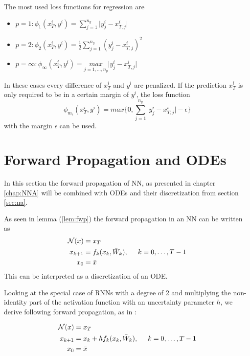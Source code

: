 \documentclass[a4paper, 12pt]{scrreprt} %
\begin{document}
The most used loss functions for regression are

\begin{itemize}
	\item $p=1: \phi_1(x^i_T,y^i)=\sum_{j=1}^{n_y}\vert y_j^i - x^i_{T,j} \vert$
	\item $p=2: \phi_2(x^i_T,y^i)=\frac{1}{2}\sum_{j=1}^{n_y}(y_j^i - x^i_{T,j})^2$
	\item $p=\infty: \phi_{\infty}(x^i_T,y^i)=\underset{j=1,\dots,n_y}{max}\vert y_j^i - x^i_{T,j} \vert$
\end{itemize}

In these cases every difference of $x^i_{T}$ and $y^i$ are penalized. If the prediction $x^i_{T}$ is only required to be in a certain margin of $y^i$, the loss function
\begin{equation*}
\phi_{m_{\epsilon}}(x^i_T,y^i) = max\{0,\sum_{j=1}^{n_y}\vert y_j^i - x^i_{T,j} \vert - \epsilon\}
\end{equation*}
with the margin $\epsilon$ can be used.


\section{Forward Propagation and \acp{ODE}}
\label{sec:fpaode}
In this section the forward propagation of \ac{NN}, as presented in chapter \ref{chap:NNA} will be combined with \acp{ODE} and their discretization from section \ref{sec:na}.  \cite{mpbafdl} \newline

As seen in lemma (\ref{lem:fwp}) the forward propagation in an \ac{NN} can be written as
\begin{align*}
\mathcal{N}(x) &= x_T \\
x_{k+1} &= f_{k}(x_{k},\bar{W}_{k}) , \hspace{0.5cm}k = 0, \dots, T-1 \\
x_0 &= \bar{x} 
\end{align*}
This can be interpreted as a discretization of an \ac{ODE}. 

Looking at the special case of \acp{RNN} with a degree of 2 and multiplying the non-identity part of the activation function with an uncertainty parameter $h$, we derive following forward propagation, as in \cite{safdnn}:

\begin{align}
\begin{split}
\mathcal{N}(x) &= x_T \\
x_{k+1} &= x_k + h f_{k}(x_{k},\bar{W}_{k}) , \hspace{0.5cm}k = 0, \dots, T-1 \\
x_0 &= \bar{x} 
\end{split}
\label{eq:ResNetFwEul}
\end{align}
\end{document}
